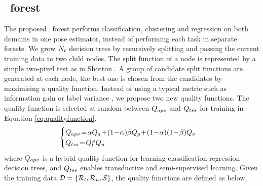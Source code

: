 \subsection{\STR\ forest} 
\label{sec/hand/methodology:strf}
The proposed \STR\ forest performs classification, clustering and regression on both domains in one pose estimator, instead of performing each task in separate forests.    
We grow $N_{t}$ decision trees by recursively splitting and passing the current training data to two child nodes. 
The split function of a node is represented by a simple two-pixel test as in Shotton \etal \cite{Shotton2011}. 
A group of candidate split functions are generated at each node, the best one is chosen from the candidates by maximising a quality function.   
Instead of using a typical metric such as information gain or label variance \cite{Shotton2013}, we propose two new quality functions.
The quality function is selected at random between $Q_{apv}$ and $Q_{tss}$ for training in Equation \ref{eq:qualityfunction}. 
\begin{equation}
	\begin{cases}
		\vpjterm\!=\!\viewparam\viewterm\!+\!(1\!-\!\viewparam)\classparam\classterm\!+\!(1\!-\!\viewparam)(1\!-\!\classparam)\regterm \\ 
		\tssterm\!=\!\pairterm^{\tssparam}\usterm 
	\end{cases}
	\label{eq:qualityfunction}
\end{equation}
where $Q_{apv}$ is a hybrid quality function for learning classification-regression decision trees, and $Q_{tss}$ enables transductive and semi-supervised learning. 
Given the training data $\mathcal{D} = \{\mathcal{R}_{l}, \mathcal{R}_{u}, \mathcal{S}\}$, the quality functions are defined as below.   

